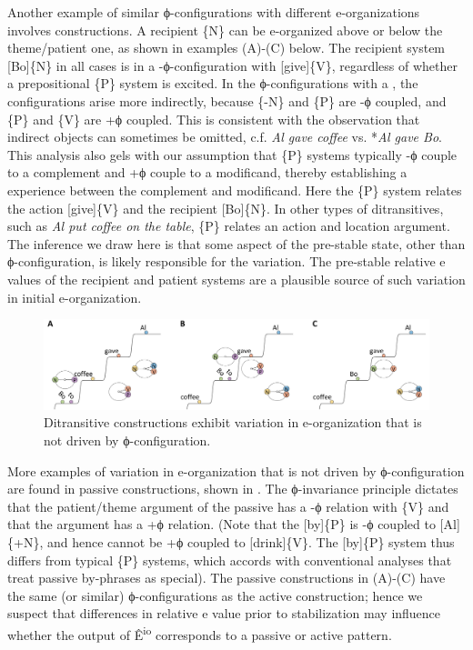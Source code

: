   Another example of similar ϕ-con\-fig\-u\-ra\-tions with different e-organizations involves  constructions. A recipient \{N\} can be e-organized above or below the theme/patient one, as shown in examples (A)-(C) below. The recipient system [Bo]\{N\} in all cases is in a -ϕ-con\-fig\-u\-ra\-tion with [give]\{V\}, regardless of whether a prepositional \{P\} system is excited. In the ϕ-con\-fig\-u\-ra\-tions with a , the configurations arise more indirectly, because \{-N\} and \{P\} are -ϕ coupled, and \{P\} and \{V\} are +ϕ coupled. This is consistent with the observation that indirect objects can sometimes be omitted, c.f. \textit{Al gave coffee} vs. *\textit{Al gave Bo}. This analysis also gels with our assumption that \{P\} systems typically -ϕ couple to a complement and +ϕ couple to a modificand, thereby establishing a  experience between the complement and modificand. Here the \{P\} system relates the action [give]\{V\} and the recipient [Bo]\{N\}. In other types of ditransitives, such as \textit{Al put coffee on the table}, \{P\} relates an action and location argument. The inference we draw here is that some aspect of the pre-stable state, other than ϕ-con\-fig\-u\-ra\-tion, is likely responsible for the variation. The pre-stable relative e values of the recipient and patient systems are a plausible source of such variation in initial e-organization.

  
\begin{figure}
\includegraphics[width=\textwidth]{figures/Tilsen-img80.png}
\caption{Ditransitive constructions exhibit variation in e-organization that is not driven by ϕ-con\-fig\-u\-ra\-tion.}
\label{fig:4:30}
\end{figure}
 

  More examples of variation in e-organization that is not driven by ϕ-con\-fig\-u\-ra\-tion are found in passive constructions, shown in {}. The ϕ-invariance principle dictates that the patient/theme argument of the passive has a -ϕ relation with \{V\} and that the  argument has a +ϕ relation. (Note that the  [by]\{P\} is -ϕ coupled to [Al]\{+N\}, and hence cannot be +ϕ coupled to [drink]\{V\}. The [by]\{P\} system thus differs from typical \{P\} systems, which accords with conventional analyses that treat passive by-phrases as special). The passive constructions in {}(A)-(C) have the same (or similar) ϕ-con\-fig\-u\-ra\-tions as the active construction; hence we suspect that differences in relative e value prior to stabilization may influence whether the output of Ê\textsuperscript{io} corresponds to a passive or active pattern.

